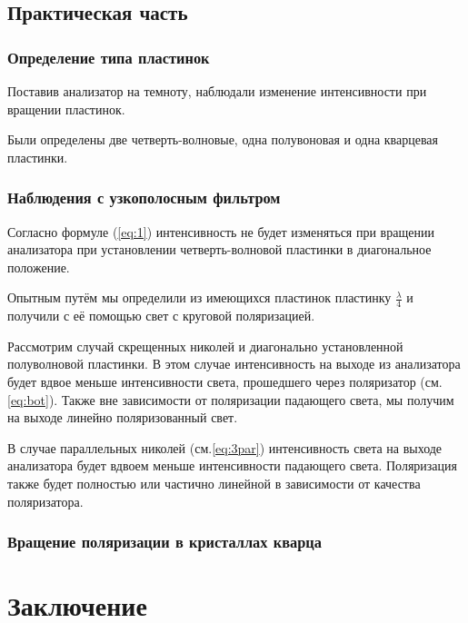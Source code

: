 \subsection{Практическая часть}
\subsubsection{Определение типа пластинок}
Поставив анализатор на темноту, наблюдали изменение интенсивности при вращении пластинок.

Были определены две четверть-волновые, одна полувоновая и одна кварцевая пластинки. 

\subsubsection{Наблюдения с узкополосным фильтром}
Согласно формуле (\ref{eq:1}) интенсивность не будет изменяться при вращении анализатора при установлении четверть-волновой пластинки в диагональное положение. 

Опытным путём мы определили из имеющихся пластинок пластинку $\frac{\lambda}{4}$ и получили с её помощью свет с круговой поляризацией.

Рассмотрим случай скрещенных николей и диагонально установленной полуволновой пластинки. В этом случае интенсивность на выходе из анализатора будет вдвое меньше интенсивности света, прошедшего через поляризатор (см.\ref{eq:bot}). Также вне зависимости от поляризации падающего света, мы получим на выходе линейно поляризованный свет.

В случае параллельных николей (см.\ref{eq:3par}) интенсивность света на выходе анализатора будет вдвоем меньше интенсивности падающего света. Поляризация также будет полностью или частично линейной в зависимости от качества поляризатора. 
\subsubsection{Вращение поляризации в кристаллах кварца}





\newpage
\section{Заключение}

